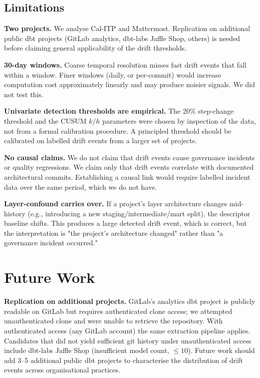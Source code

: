 \documentclass[11pt,a4paper]{article}
\begin{document}
\subsection{Limitations}

\textbf{Two projects.} We analyse Cal-ITP and Mattermost. Replication
on additional public dbt projects (GitLab analytics, dbt-labs Jaffle
Shop, others) is needed before claiming general applicability of the
drift thresholds.

\textbf{30-day windows.} Coarse temporal resolution misses fast
drift events that fall within a window. Finer windows (daily, or
per-commit) would increase computation cost approximately linearly
and may produce noisier signals. We did not test this.

\textbf{Univariate detection thresholds are empirical.} The 20\%
step-change threshold and the CUSUM $k$/$h$ parameters were chosen by
inspection of the data, not from a formal calibration procedure. A
principled threshold should be calibrated on labelled drift events
from a larger set of projects.

\textbf{No causal claims.} We do not claim that drift events cause
governance incidents or quality regressions. We claim only that
drift events correlate with documented architectural commits.
Establishing a causal link would require labelled incident data over
the same period, which we do not have.

\textbf{Layer-confound carries over.} If a project's layer
architecture changes mid-history (e.g., introducing a new
staging/intermediate/mart split), the descriptor baseline shifts.
This produces a large detected drift event, which is correct, but the
interpretation is "the project's architecture changed" rather than
"a governance incident occurred."

\section{Future Work}

\textbf{Replication on additional projects.} GitLab's analytics dbt
project is publicly readable on GitLab but requires authenticated
clone access; we attempted unauthenticated clone and were unable to
retrieve the repository. With authenticated access (any GitLab
account) the same extraction pipeline applies. Candidates that did
not yield sufficient git history under unauthenticated access include
dbt-labs Jaffle Shop (insufficient model count, $\leq 10$). Future
work should add 3--5 additional public dbt projects to characterise
the distribution of drift events across organisational practices.
\end{document}
